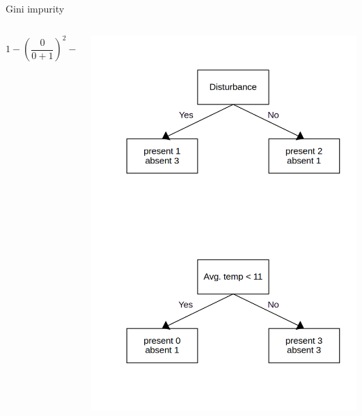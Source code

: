 \documentclass{irdbeamer}
\begin{document}
\begin{frame}{Gini impurity}
\begin{columns}
    \begin{column}{0.5\textwidth}
\centering
$$
        1 - (\frac{0}{0+1})^2 - (\frac{1}{0+1})^2 = 0
 $$
    \end{column}
    \begin{column}{0.5\textwidth}
\centering
    \includegraphics[width=.8\textwidth]{./figs/schemas/gini.png}%
\end{column}
\end{columns}
\end{frame}
\end{document}
